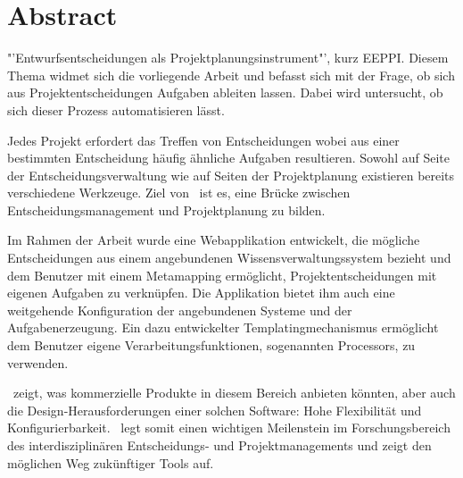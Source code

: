 \chapter*{Abstract}
	

	"'Entwurfsentscheidungen als Projektplanungsinstrument"', kurz EEPPI. 
	Diesem Thema widmet sich die vorliegende Arbeit und befasst sich mit der Frage, 
	ob sich aus Projektentscheidungen Aufgaben ableiten lassen.
	Dabei wird untersucht, ob sich dieser Prozess automatisieren lässt.

	Jedes Projekt erfordert das Treffen von Entscheidungen wobei aus einer bestimmten Entscheidung häufig ähnliche Aufgaben resultieren.
	Sowohl auf Seite der Entscheidungsverwaltung wie auf Seiten der Projektplanung existieren bereits verschiedene Werkzeuge.
	Ziel von \eeppi\ ist es, eine Brücke zwischen Entscheidungsmanagement und Projektplanung zu bilden.

	Im Rahmen der Arbeit wurde eine Webapplikation entwickelt, 
	die mögliche Entscheidungen aus einem angebundenen Wissensverwaltungssystem bezieht
	und dem Benutzer mit einem Metamapping ermöglicht,
	Projektentscheidungen mit eigenen Aufgaben zu verknüpfen.
	Die Applikation bietet ihm auch eine weitgehende Konfiguration der angebundenen Systeme und der Aufgabenerzeugung. 
	Ein dazu entwickelter Templatingmechanismus ermöglicht dem Benutzer eigene Verarbeitungsfunktionen, sogenannten Processors, zu verwenden.

	\eeppi\ zeigt, was kommerzielle Produkte in diesem Bereich anbieten könnten,
	aber auch die Design-Herausforderungen einer solchen Software: 
	Hohe Flexibilität und Konfigurierbarkeit.
	\eeppi\ legt somit einen wichtigen Meilenstein im Forschungsbereich des interdisziplinären Entscheidungs- und Projektmanagements und
	zeigt den möglichen Weg zukünftiger Tools auf.
